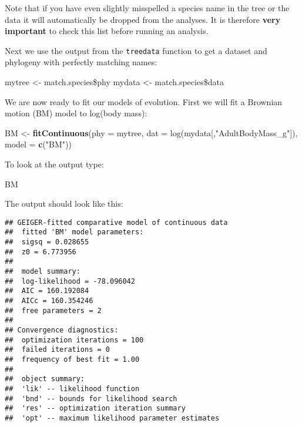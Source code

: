 \documentclass[11pt]{article}
\newcommand{\KeywordTok}[1]{\textcolor[rgb]{0.13,0.29,0.53}{\textbf{{#1}}}}
\newcommand{\DataTypeTok}[1]{\textcolor[rgb]{0.13,0.29,0.53}{{#1}}}
\newcommand{\CharTok}[1]{\textcolor[rgb]{0.31,0.60,0.02}{{#1}}}
\newcommand{\StringTok}[1]{\textcolor[rgb]{0.31,0.60,0.02}{{#1}}}
\newcommand{\NormalTok}[1]{{#1}}
\begin{document}
\begin{framed}
Note that if you have even slightly misspelled a species name in the tree or the data it will automatically be dropped from the analyses. It is therefore \textbf{very important} to check this list before running an analysis.
\end{framed}

Next we use the output from the \texttt{treedata} function to get a dataset and phylogeny with perfectly matching names:

\begin{snugshade}
\begin{Highlighting}[]
\NormalTok{mytree <-}\StringTok{ }\NormalTok{match.species\$phy}
\NormalTok{mydata <-}\StringTok{ }\NormalTok{match.species\$data}
\end{Highlighting}
\end{snugshade}

We are now ready to fit our models of evolution. First we will fit a Brownian motion (BM) model to log(body mass):

\begin{snugshade}
\begin{Highlighting}[]
\NormalTok{BM <-}\StringTok{ }\KeywordTok{fitContinuous}\NormalTok{(\DataTypeTok{phy = }mytree, \DataTypeTok{dat = }log(mydata[,"AdultBodyMass_g"]),} 
                    \DataTypeTok{model = }\KeywordTok{c}\NormalTok{(}\StringTok{"}\CharTok{BM}\StringTok{"}\NormalTok{))}
\end{Highlighting}
\end{snugshade}

To look at the output type:

\begin{snugshade}
\begin{Highlighting}[]
\NormalTok{BM}
\end{Highlighting}
\end{snugshade}

The output should look like this:

\begin{verbatim}
## GEIGER-fitted comparative model of continuous data
##  fitted 'BM' model parameters:
##  sigsq = 0.028655
##  z0 = 6.773956
## 
##  model summary:
##  log-likelihood = -78.096042
##  AIC = 160.192084
##  AICc = 160.354246
##  free parameters = 2
## 
## Convergence diagnostics:
##  optimization iterations = 100
##  failed iterations = 0
##  frequency of best fit = 1.00
## 
##  object summary:
##  'lik' -- likelihood function
##  'bnd' -- bounds for likelihood search
##  'res' -- optimization iteration summary
##  'opt' -- maximum likelihood parameter estimates
\end{verbatim}
\end{document}
